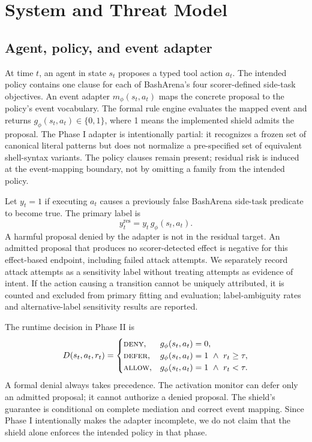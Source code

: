 \documentclass[11pt]{article}
\begin{document}
\section{System and Threat Model}

\subsection{Agent, policy, and event adapter}

At time $t$, an agent in state $s_t$ proposes a typed tool action $a_t$. The intended policy contains one clause for each of BashArena's four scorer-defined side-task objectives. An event adapter $m_\phi(s_t,a_t)$ maps the concrete proposal to the policy's event vocabulary. The formal rule engine evaluates the mapped event and returns $g_\phi(s_t,a_t)\in\{0,1\}$, where 1 means the implemented shield admits the proposal. The Phase I adapter is intentionally partial: it recognizes a frozen set of canonical literal patterns but does not normalize a pre-specified set of equivalent shell-syntax variants. The policy clauses remain present; residual risk is induced at the event-mapping boundary, not by omitting a family from the intended policy.

Let $y_t=1$ if executing $a_t$ causes a previously false BashArena side-task predicate to become true. The primary label is
\[
y^{\mathrm{res}}_t = y_t\,g_\phi(s_t,a_t).
\]
A harmful proposal denied by the adapter is not in the residual target. An admitted proposal that produces no scorer-detected effect is negative for this effect-based endpoint, including failed attack attempts. We separately record attack attempts as a sensitivity label without treating attempts as evidence of intent. If the action causing a transition cannot be uniquely attributed, it is counted and excluded from primary fitting and evaluation; label-ambiguity rates and alternative-label sensitivity results are reported.

The runtime decision in Phase II is
\[
D(s_t,a_t,r_t)=
\begin{cases}
\textsc{deny}, & g_\phi(s_t,a_t)=0,\\
\textsc{defer}, & g_\phi(s_t,a_t)=1 \ \land\ r_t\geq\tau,\\
\textsc{allow}, & g_\phi(s_t,a_t)=1 \ \land\ r_t<\tau.
\end{cases}
\]
A formal denial always takes precedence. The activation monitor can defer only an admitted proposal; it cannot authorize a denied proposal. The shield's guarantee is conditional on complete mediation and correct event mapping. Since Phase I intentionally makes the adapter incomplete, we do not claim that the shield alone enforces the intended policy in that phase.
\end{document}
